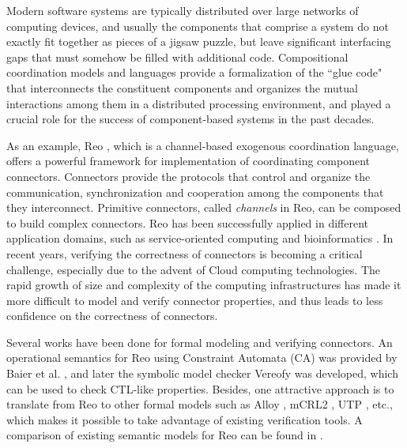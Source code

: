 \documentclass[preprint,3p]{elsarticle}
\begin{document}
Modern software systems are typically distributed over large networks of computing devices, and usually the components
that comprise a system do not exactly fit together as pieces of a jigsaw puzzle, but leave significant interfacing gaps
that must somehow be filled with additional code. Compositional coordination models and languages provide a formalization
of the ``glue code" that interconnects the constituent components and organizes the mutual interactions among them in a
distributed processing environment, and played a crucial role for the success of component-based systems in the past decades.

As an example, Reo \cite{Arb04}, which is a channel-based exogenous coordination language, offers
a powerful framework for implementation of coordinating component connectors. Connectors provide the protocols that control and organize
the communication, synchronization and cooperation among the components that they interconnect. Primitive connectors, called {\em channels}
in Reo, can be composed to build complex connectors. Reo has been successfully applied in different application domains, such as
service-oriented computing and bioinformatics \cite{CCA04, SA07}. In recent years,
verifying the correctness of connectors is becoming a critical challenge, especially due to the advent of Cloud computing
technologies. The rapid growth of size and complexity of the computing infrastructures has made it more difficult to model
and verify connector properties, and thus leads to less confidence on the correctness of connectors.


Several works have been done for formal modeling and verifying
connectors. An operational semantics for Reo using Constraint Automata
(CA) was provided by Baier et al. \cite{BSAR06}, and later the symbolic model checker Vereofy \cite{BBK+10} was developed,
which can be used to check CTL-like properties.
Besides, one attractive approach is to translate from Reo to other formal models such as Alloy
\cite{KSA+08}, mCRL2 \cite{KKV12}, UTP \cite{AAA+09,SAA+12}, etc.,
which makes it possible to take advantage of existing verification
tools. A comparison of existing semantic models for Reo can be found
in \cite{JA12}.
\end{document}
